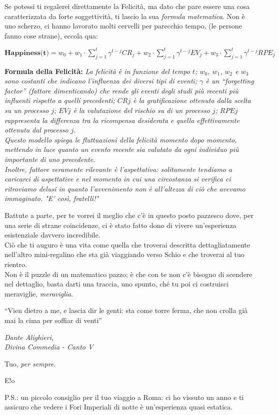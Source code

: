 \documentclass[11pt]{article}
\begin{document}
Se potessi ti regalerei direttamente la Felicità, ma dato che pare essere una cosa caratterizzata da forte soggettività, ti lascio la sua {\em formula matematica}. Non è uno scherzo, ci hanno lavorato molti cervelli per parecchio tempo, (le persone fanno cose strane), eccola qua:

	{\em $\textbf{Happiness(t)}=w_{0}+w_{1} \cdot\displaystyle{\sum_{j=1}^{t}} \gamma^{t-j} C R_{j}+w_{2} \cdot\sum_{j=1}^{t} \gamma^{t-j} E V_{j}+w_{3} \cdot\sum_{j=1}^{t} \gamma^{t-j} R P E_{j}$}
	
	\begin{quoting}{\textbf{\small Formula della Felicità:} {\em La felicità è in funzione del tempo $t$; $w_0$, $w_1$, $w_2$ e $w_3$ sono costanti che indicano l’influenza dei diversi tipi di eventi; $\gamma$ è un “forgetting factor” (fattore dimenticando) che rende gli eventi degli studi più recenti più influenti rispetto a quelli precedenti; $CRj$ è la gratificazione ottenuta dalla scelta su un processo $j$; $EVj$ è la valutazione del rischio su di un processo $j$; $RPEj$ rappresenta la differenza tra la ricompensa desiderata e quella effettivamente ottenuta dal processo $j$.\\
Questo modello spiega le fluttuazioni della felicità momento dopo momento, mettendo in luce quanto un evento recente sia valutato da ogni individuo più importante di uno precedente.\\
Inoltre, fattore veramente rilevante è l’aspettativa: solitamente tendiamo a caricarci di aspettative e nel momento in cui una circostanza si verifica ci ritroviamo delusi in quanto l’avvenimento non è all’altezza di ciò che avevamo immaginato. "E' così, fratellì!"}}
\end{quoting}

Battute a parte, per te vorrei il meglio che c’è in questo posto pazzesco dove, per una serie di strane coincidenze, ci è stato fatto dono di vivere un’esperienza esistenziale davvero incredibile. \\
Ciò che ti auguro è una vita come quella che troverai descritta dettagliatamente nell'altro mini-regalino che sta già viaggiando verso Schio e che troverai al tuo rientro.\\
Non è il puzzle di un matematico pazzo; è che con te non c'è bisogno di scendere nel dettaglio, basta darti una traccia, uno spunto, ché tu poi ci costruisci meraviglie, {\em meraviglia}.

\epigraph{“Vien dietro a me, e lascia dir le genti:
sta come torre ferma, che non crolla
già mai la cima per soffiar di venti”}{\textit {Dante Alighieri, \\ Divina Commedia - Canto V}}
Tuo, {\em per sempre}.

E!o

\vspace{18pt}
P.S.: un piccolo consiglio per il tuo viaggio a Roma: ci ho vissuto un anno e ti assicuro che vedere i Fori Imperiali di notte è un'esperienza quasi estatica.
\end{document}
